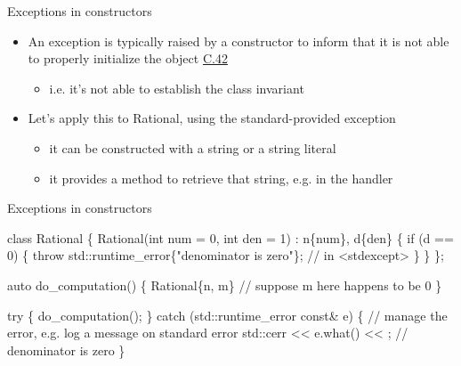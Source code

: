 \begin{frame}[fragile]{Exceptions in constructors}

  \begin{itemize}
  \item An exception is typically raised by a constructor to inform that it is
    not able to properly initialize the object
    \href{https://isocpp.github.io/CppCoreGuidelines/CppCoreGuidelines#c42-if-a-constructor-cannot-construct-a-valid-object-throw-an-exception}{C.42}
    \begin{itemize}
    \item i.e. it's not able to establish the class invariant
    \end{itemize}
  \item Let's apply this to Rational, using the standard-provided exception 
    \begin{itemize}
    \item it can be constructed with a string or a string literal
    \item it provides a  method to retrieve that string, e.g. in
      the handler
    \end{itemize}
  \end{itemize}

\end{frame}

\begin{frame}[fragile]{Exceptions in constructors \insertcontinuationtext}

    \begin{codeblock}
class Rational \{
  \ddd
  Rational(int num = 0, int den = 1) : n\{num\}, d\{den\} \{
    if (d == 0) \{
      \alert{throw} std::runtime_error\{"denominator is zero"\}; // in <stdexcept>
    \}
    \ddd
  \}
\};

auto do_computation() \{
  \ddd
  Rational\{n, m\} // suppose m here happens to be 0
  \ddd  
\}

\alert{try} \{
  do_computation();
  \ddd
\} \alert{catch} (std::runtime_error const& e) \{
  // manage the error, e.g. log a message on standard error
  std::cerr << e.what() << \bslashn; // denominator is zero
\}\end{codeblock}

\end{frame}

